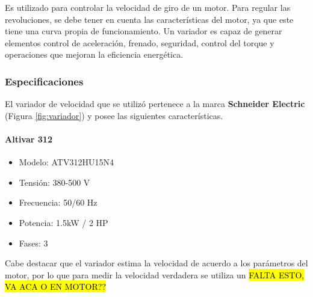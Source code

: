 \begin{tcolorbox}[colback=blue!5!white,colframe=blue!75!black,title=Variador de velocidad]
	Es utilizado para controlar la velocidad de giro de un motor. 
	Para regular las revoluciones, se debe tener en cuenta las características del motor, ya que este tiene una curva propia de funcionamiento. Un variador es capaz de generar elementos control de aceleración, frenado, seguridad, control del torque y operaciones que mejoran la eficiencia energética.
\end{tcolorbox}

\subsubsection{Especificaciones}
El variador de velocidad que se utilizó pertenece a la marca \textbf{Schneider Electric} (Figura \ref{fig:variador}) y posee las siguientes características. 
\paragraph*{Altivar 312}
\begin{minipage}[t]{.5\textwidth}
	\begin{itemize}
		\item 	Modelo: ATV312HU15N4
		\item   Tensión: 380-500 V
		\item 	Frecuencia: 50/60 Hz
		\item 	Potencia: 1.5kW / 2 HP
		\item 	Fases: 3
	\end{itemize}
\end{minipage}
\begin{minipage}[t]{.5\textwidth}
	\centering{}
	\label{fig:variador}
\end{minipage}


Cabe destacar que el variador estima la velocidad de acuerdo a los parámetros del motor, por lo que para medir la velocidad verdadera se utiliza un \hl{FALTA ESTO, VA ACA O EN MOTOR??}



